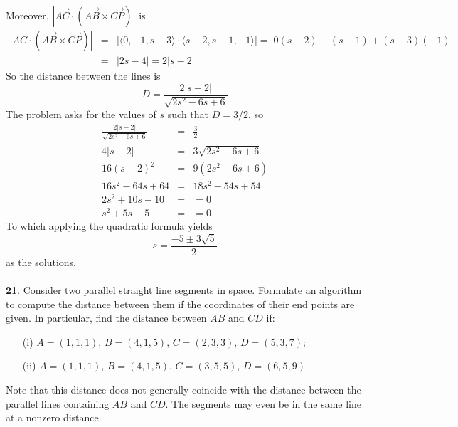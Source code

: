 \documentclass[12pt]{amsbook}
\newcommand{\la}{\langle}
\newcommand{\ra}{\rangle}
\begin{document}
Moreover, $|\overrightarrow{AC}\cdot(\overrightarrow{AB}\times\overrightarrow{CP})|$ is
\begin{eqnarray*}
|\overrightarrow{AC}\cdot(\overrightarrow{AB}\times\overrightarrow{CP})|&=&|\la 0,-1,s-3 \ra\cdot \la s-2,s-1,-1\ra|=|0(s-2)-(s-1)+(s-3)(-1)|\\
&=&|2s-4|=2|s-2|
\end{eqnarray*}
So the distance between the lines is 
$$D=\frac{2|s-2|}{\sqrt{2s^2-6s+6}}$$
The problem asks for the values of $s$ such that $D=3/2$, so 
\begin{eqnarray*}
\frac{2|s-2|}{\sqrt{2s^2-6s+6}}&=&\frac{3}{2}\\
4|s-2|&=&3\sqrt{2s^2-6s+6}\\
16(s-2)^2&=&9(2s^2-6s+6)\\
16s^2-64s+64&=&18s^2-54s+54\\
2s^2+10s-10&=&=0\\
s^2+5s-5&=&=0
\end{eqnarray*}
To which applying the quadratic formula yields $$s=\frac{-5\pm3\sqrt{5}}{2}$$
as the solutions.
\\
\\
{\small\bf 21}. Consider two parallel straight line segments
in space. Formulate an algorithm to compute 
the distance between them if the coordinates of their
end points are given. In particular, find the  
distance between $AB$ and $CD$ if:
\begin{enumerate}
\item[(i)] $A=(1,1,1)$, $B=(4,1,5)$, $C=(2,3,3)$, $D=(5,3,7)$;
\item[(ii)] $A=(1,1,1)$, $B=(4,1,5)$, $C=(3,5,5)$, $D=(6,5,9)$
\end{enumerate}
Note that this distance does not generally 
coincide with the distance between the parallel lines 
containing $AB$ and $CD$. The segments may even be in the same 
line at a nonzero distance.\\
\\
\end{document}
